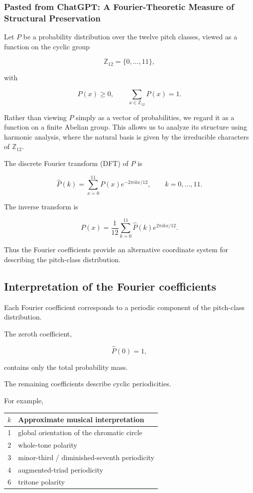 \documentclass[twoside,onecolumn]{article}
\begin{document}
\subsubsection{Pasted from ChatGPT: A Fourier-Theoretic Measure of Structural Preservation}

Let $P$ be a probability distribution over the twelve pitch classes, viewed as a function on the cyclic group

\[
\mathbb{Z}_{12} = \{0,\ldots,11\},
\]

with

\[
P(x)\ge0,\qquad
\sum_{x\in\mathbb Z_{12}}P(x)=1.
\]

Rather than viewing $P$ simply as a vector of probabilities, we regard it as a function on a finite Abelian group. This allows us to analyze its structure using harmonic analysis, where the natural basis is given by the irreducible characters of $\mathbb Z_{12}$.

The discrete Fourier transform (DFT) of $P$ is

\[
\widehat P(k)
=
\sum_{x=0}^{11}
P(x)
e^{-2\pi i kx/12},
\qquad
k=0,\ldots,11.
\]

The inverse transform is

\[
P(x)
=
\frac1{12}
\sum_{k=0}^{11}
\widehat P(k)
e^{2\pi i kx/12}.
\]

Thus the Fourier coefficients provide an alternative coordinate system for describing the pitch-class distribution.

\subsection{Interpretation of the Fourier coefficients}

Each Fourier coefficient corresponds to a periodic component of the pitch-class distribution.

The zeroth coefficient,

\[
\widehat P(0)=1,
\]

contains only the total probability mass.

The remaining coefficients describe cyclic periodicities.

For example,

\begin{center}
\begin{tabular}{cl}
$k$ & Approximate musical interpretation\\
\hline
1 & global orientation of the chromatic circle\\
2 & whole-tone polarity\\
3 & minor-third / diminished-seventh periodicity\\
4 & augmented-triad periodicity\\
6 & tritone polarity
\end{tabular}
\end{center}
\end{document}
